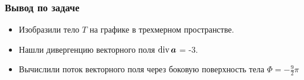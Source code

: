 \begin{frame}\frametitle{Вывод по задаче}
	\begin{itemize}
		\item Изобразили тело \(T\) на графике в трехмерном пространстве.

		\item Нашли дивергенцию векторного поля \(\Div \vec a\) = -3.

		\item Вычислили поток векторного поля через боковую поверхность тела \(\Phi = -\frac{9}{2}\pi \)
	\end{itemize}

\end{frame}
